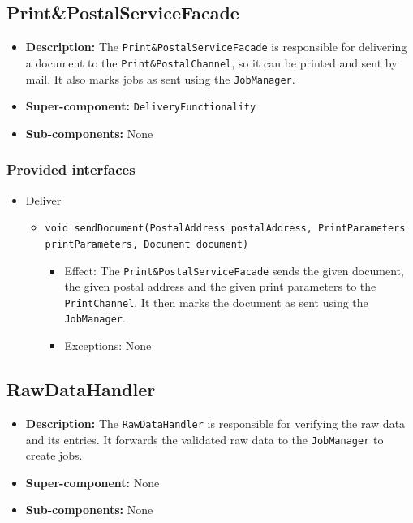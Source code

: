 \documentclass[a4paper,10pt]{article}
\begin{document}
\subsection{Print\&PostalServiceFacade}
\begin{itemize}
    \item \textbf{Description:} The \texttt{Print\&PostalServiceFacade} is responsible for delivering a document to the \texttt{Print\&PostalChannel}, so it can be printed and sent by mail. It also marks jobs as sent using the \texttt{JobManager}.
    \item \textbf{Super-component:} \texttt{DeliveryFunctionality}
    \item \textbf{Sub-components:} None
\end{itemize}

\subsubsection*{Provided interfaces}
\begin{itemize}
    \item Deliver
    \begin{itemize}
        \item \texttt{void sendDocument(PostalAddress postalAddress, PrintParameters printParameters, Document document)}
        \begin{itemize}
            \item Effect: The \texttt{Print\&PostalServiceFacade} sends the given document, the given postal address and the given print parameters to the \texttt{PrintChannel}. It then marks the document as sent using the \texttt{JobManager}.
            \item Exceptions: None
		\end{itemize}
    \end{itemize}
\end{itemize}



\subsection{RawDataHandler}
\begin{itemize}
    \item \textbf{Description:} The \texttt{RawDataHandler} is responsible for verifying the raw data and its entries. It forwards the validated raw data to the \texttt{JobManager} to create jobs.
    \item \textbf{Super-component:} None
    \item \textbf{Sub-components:} None
\end{itemize}
\end{document}
